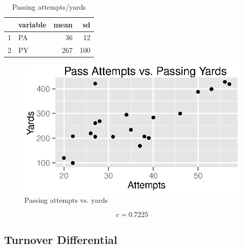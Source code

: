 \documentclass{exam}
\begin{document}
  \begin{table}[H]
    \centering
    \begin{tabular}{rlrr}
      \toprule
        & variable & mean & sd \\
      \midrule
      1 & PA       & 36   & 12 \\
      2 & PY       & 267  & 100 \\
      \bottomrule
    \end{tabular}
    \caption{Passing attempts/yards}
  \end{table}

  \begin{figure}[H]
    \centering
    \includegraphics{figures/nfl/passing_attempts_vs_yds.eps}
    \caption{Passing attempts vs. yards}
  \end{figure}

  \[
    c = 0.7225
  \]

  \subsection{Turnover Differential}
\end{document}
